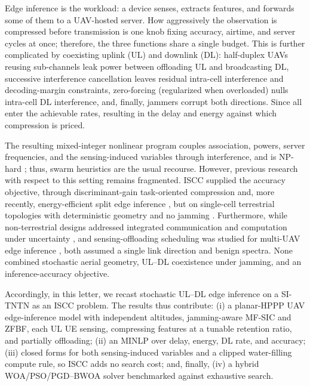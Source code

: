 \documentclass[journal]{IEEEtran}
\begin{document}
Edge inference is the workload: a device senses, extracts features, and forwards some of them to a UAV-hosted server. How aggressively the observation is compressed before transmission is one knob fixing accuracy, airtime, and server cycles at once; therefore, the three functions share a single budget. 
This is further complicated by coexisting uplink (UL) and downlink (DL): half-duplex UAVs reusing sub-channels leak power between offloading UL and broadcasting DL, successive interference cancellation leaves residual intra-cell interference and decoding-margin constraints, zero-forcing (regularized when overloaded) nulls intra-cell DL interference, and, finally, jammers corrupt both directions. 
Since all enter the achievable rates, resulting in the delay and energy against which compression is priced.

The resulting mixed-integer nonlinear program couples association, powers, server frequencies, and the sensing-induced variables through interference, and is NP-hard \cite{Hoang_TCOM_2024}; thus, swarm heuristics \cite{book_SI2010,genetic_optim} are the usual recourse. 
However, previous research with respect to this setting remains fragmented. ISCC supplied the accuracy objective, through discriminant-gain task-oriented compression \cite{wen2024iscc} and, more recently, energy-efficient split edge inference \cite{yao2025edgeinf}, but on single-cell terrestrial topologies with deterministic geometry and no jamming \cite{wen2025survey}. 
Furthermore, while non-terrestrial designs addressed integrated communication and computation under uncertainty \cite{tang2025ntn}, and sensing-offloading scheduling was studied for multi-UAV edge inference \cite{du2026uavinf}, both assumed a single link direction and benign spectra. 
None combined stochastic aerial geometry, UL--DL coexistence under jamming, and an inference-accuracy objective.

Accordingly, in this letter, we {\color{green!70!black}recast} stochastic UL--DL edge inference on a SI-TNTN as an ISCC problem. 
The results thus contribute: (i) a planar-HPPP UAV edge-inference model with independent altitudes, jamming-aware MF-SIC and ZFBF, each UL UE sensing, compressing features at a tunable retention ratio, and partially offloading; (ii) an MINLP over delay, energy, DL rate, and accuracy; (iii) closed forms for both sensing-induced variables and a clipped water-filling compute rule, so ISCC adds no search cost; and, finally, (iv) a hybrid {WOA/PSO/PGD}--BWOA solver benchmarked against exhaustive search.
\end{document}
